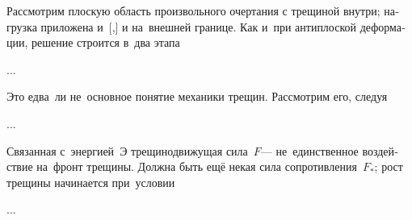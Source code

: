 
\begin{otherlanguage}{russian}

Рассмотрим плоскую область произвольного очертания с трещиной внутри; нагрузка приложена и~[,] и на~внешней границе. Как и~при антиплоской деформации, решение строится в~два этапа

...



\end{otherlanguage}



\begin{otherlanguage}{russian}

Это едва~ли не~основное понятие механики трещин. Рассмотрим его, следуя

...



\end{otherlanguage}



\begin{otherlanguage}{russian}

Связанная с~энергией~$\textit{Э}$ трещинодвижущая сила~$F$\:--- не~единственное воздействие на~фронт трещины. Должна быть ещё некая сила сопротивления~$F_{*}$; рост трещины начинается при~условии

...



\end{otherlanguage}

